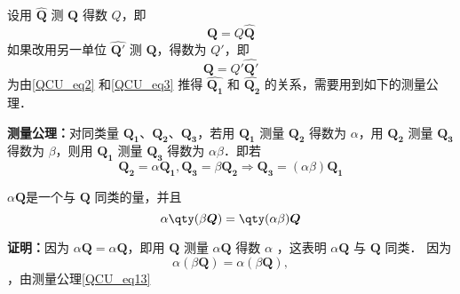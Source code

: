 设用 $\hat{\boldsymbol{Q}}$ 测 $\boldsymbol{Q}$ 得数 $Q$，即
\begin{equation}\label{QCU_eq2}
\boldsymbol{Q}=Q\hat{\boldsymbol{Q}}
\end{equation}
如果改用另一单位 $\hat{\boldsymbol{Q'}}$ 测 $\boldsymbol{Q}$，得数为 $Q'$，即
\begin{equation}\label{QCU_eq3}
\boldsymbol{Q}=Q'\hat{\boldsymbol{Q'}}
\end{equation}
为由\autoref{QCU_eq2} 和\autoref{QCU_eq3} 推得 $\hat{\boldsymbol{Q_1}}$ 和 $\hat{\boldsymbol{Q_2}}$ 的关系，需要用到如下的测量公理．

\textbf{测量公理：}对同类量 $\boldsymbol{Q_1}$、$\boldsymbol{Q_2}$、$\boldsymbol{Q_3}$，若用 $\boldsymbol{Q_1}$ 测量 $\boldsymbol{Q_2}$ 得数为 $\alpha$，用 $\boldsymbol{Q_2}$ 测量 $\boldsymbol{Q_3}$ 得数为 $\beta$，则用 $\boldsymbol{Q_1}$ 测量 $\boldsymbol{Q_3}$ 得数为 $\alpha\beta$．即若
\begin{equation}\label{QCU_eq13}
\boldsymbol{Q_2}=\alpha\boldsymbol{Q_1},\boldsymbol{Q_3}=\beta\boldsymbol{Q_2}\Rightarrow \boldsymbol{Q_3}=(\alpha\beta)\boldsymbol{Q_1}
\end{equation}

\begin{theorem}{}
$\alpha \boldsymbol{Q}$是一个与 $\boldsymbol{Q}$ 同类的量，并且
\begin{equation}
\alpha\qty(\beta \boldsymbol{Q})=\qty(\alpha\beta)\boldsymbol Q
\end{equation}
\end{theorem}
\textbf{证明：}因为 $\alpha\boldsymbol{Q}=\alpha\boldsymbol{Q}$，即用 $\boldsymbol{Q}$ 测量 $\alpha\boldsymbol{Q}$ 得数 $\alpha$ ，这表明 $\alpha\boldsymbol{Q}$ 与 $\boldsymbol{Q}$ 同类．
因为
\begin{equation}
\alpha(\beta\boldsymbol{Q})=\alpha(\beta\boldsymbol{Q}),
\end{equation}
，由测量公理\autoref{QCU_eq13} 

